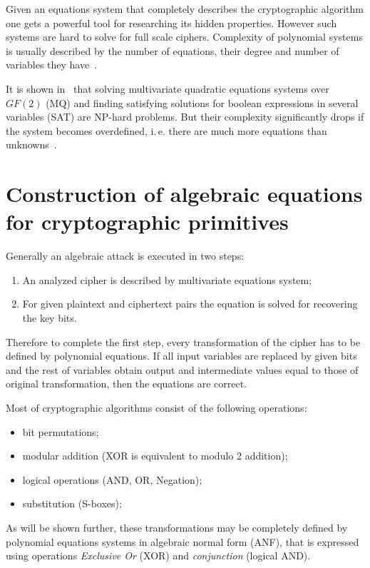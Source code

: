 Given an equations system that completely describes the cryptographic algorithm
one gets a powerful tool for researching its hidden properties. However such
systems are hard to solve for full scale ciphers. Complexity of polynomial
systems is usually described by the number of equations, their degree and number
of variables they have~\cite{bard2009algebraic}.

It is shown in~\cite{Courtois:MQ-NPhard} that solving multivariate quadratic
equations systems over $GF(2)$ (MQ) and finding satisfying solutions for boolean
expressions in several variables (SAT) are NP-hard problems. But their
complexity significantly drops if the system becomes overdefined, i.\,e. there
are much more equations than unknowns~\cite{DBLP:conf/asiacrypt/CourtoisP02}.


\section{Construction of algebraic equations for cryptographic primitives}
\label{sec:equations}

Generally an algebraic attack is executed in two steps:
\begin{enumerate}
    \item An analyzed cipher is described by multivariate equations system;
    \item For given plaintext and ciphertext pairs the equation is solved for
        recovering the key bits.
\end{enumerate}
Therefore to complete the first step, every transformation of the cipher has to
be defined by polynomial equations. If all input variables are replaced by given
bits and the rest of variables obtain output and intermediate values equal to
those of original transformation, then the equations are correct.

Most of cryptographic algorithms consist of the following operations:
\begin{itemize}
    \item bit permutations;
    \item modular addition (XOR is equivalent to modulo 2 addition);
    \item logical operations (AND, OR, Negation);
    \item substitution (S-boxes);
\end{itemize}

As will be shown further, these transformations may be completely defined by
polynomial equations systems in algebraic normal form (ANF), that is expressed
using operations \textit{Exclusive Or} (XOR) and \textit{conjunction} (logical
AND).

